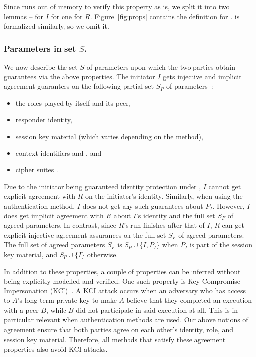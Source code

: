 Since \mTamarin{} runs out of memory to verify this property as is,
we split it into two lemmas -- \mPredImpI{} for $I$ for one \mPredImpR{} for 
$R$.
%
Figure~\ref{fig:props} contains the definition for \mPredImpI{}.
%
\mPredImpR{} is formalized similarly, so we omit it.
%

\subsubsection{Parameters in set $S$.}
\label{sec:agreedParams}
We now describe the set $S$ of parameters upon which the two parties obtain
guarantees via the above properties.
%
The initiator $I$ gets injective and implicit agreement guarantees on the
following partial set $S_P$ of parameters~\cite{Norr21}:
\begin{itemize}
    \item the roles played by itself and its peer,
    \item responder identity,
    \item session key material (which varies depending on the \mEdhoc{} 
method),
    \item context identifiers \mCi{} and \mCr{}, and
    \item cipher suites \mSuites{}.
\end{itemize}
%

Due to the initiator being guaranteed identity protection under \mEdhoc{}, $I$
cannot get explicit agreement with $R$ on the initiator's identity.
%
Similarly, when using the \mStat{} authentication method, $I$ does not get 
any
such guarantees about $P_{I}$.
%
However, $I$ does get implicit agreement with $R$ about $I$'s identity and the
full set $S_{F}$ of agreed parameters.
%
In contrast, since $R$'s run finishes after that of $I$, $R$ can get explicit
injective agreement assurances on the full set $S_{F}$ of agreed parameters.
%
The full set of agreed parameters $S_F$ is $S_P \cup \{I, P_I\}$ when $P_I$
is part of the session key material, and $S_P \cup \{I\}$ otherwise.
%

In addition to these properties, a couple of properties can be inferred
without being explicitly modelled and verified.
%
One such property is Key-Compromise Impersonation
(KCI)~\cite{DBLP:conf/ima/Blake-WilsonJM97}.
%
A KCI attack occurs when an adversary who has access to $A$'s long-term 
private
key to make $A$ believe that they completed an execution with a peer $B$,
while $B$ did not participate in said execution at all.
%
This is in particular relevant when \mStat{} authentication methods are used.
%
Our above notions of agreement ensure that both parties agree on each
other's identity, role, and session key material.
%
Therefore, all \mEdhoc{} methods that satisfy these agreement properties also
avoid KCI attacks.
%

